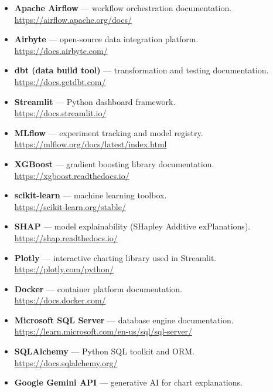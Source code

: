 \documentclass[a4paper, oneside, 12pt, final]{extreport}
\begin{document}
\begin{itemize}
    \item \textbf{Apache Airflow} --- workflow orchestration documentation.\\
          \url{https://airflow.apache.org/docs/}
    \item \textbf{Airbyte} --- open-source data integration platform.\\
          \url{https://docs.airbyte.com/}
    \item \textbf{dbt (data build tool)} --- transformation and testing documentation.\\
          \url{https://docs.getdbt.com/}
    \item \textbf{Streamlit} --- Python dashboard framework.\\
          \url{https://docs.streamlit.io/}
    \item \textbf{MLflow} --- experiment tracking and model registry.\\
          \url{https://mlflow.org/docs/latest/index.html}
    \item \textbf{XGBoost} --- gradient boosting library documentation.\\
          \url{https://xgboost.readthedocs.io/}
    \item \textbf{scikit-learn} --- machine learning toolbox.\\
          \url{https://scikit-learn.org/stable/}
    \item \textbf{SHAP} --- model explainability (SHapley Additive exPlanations).\\
          \url{https://shap.readthedocs.io/}
    \item \textbf{Plotly} --- interactive charting library used in Streamlit.\\
          \url{https://plotly.com/python/}
    \item \textbf{Docker} --- container platform documentation.\\
          \url{https://docs.docker.com/}
    \item \textbf{Microsoft SQL Server} --- database engine documentation.\\
          \url{https://learn.microsoft.com/en-us/sql/sql-server/}
    \item \textbf{SQLAlchemy} --- Python SQL toolkit and ORM.\\
          \url{https://docs.sqlalchemy.org/}
    \item \textbf{Google Gemini API} --- generative AI for chart explanations.\\

\end{itemize}
\end{document}
